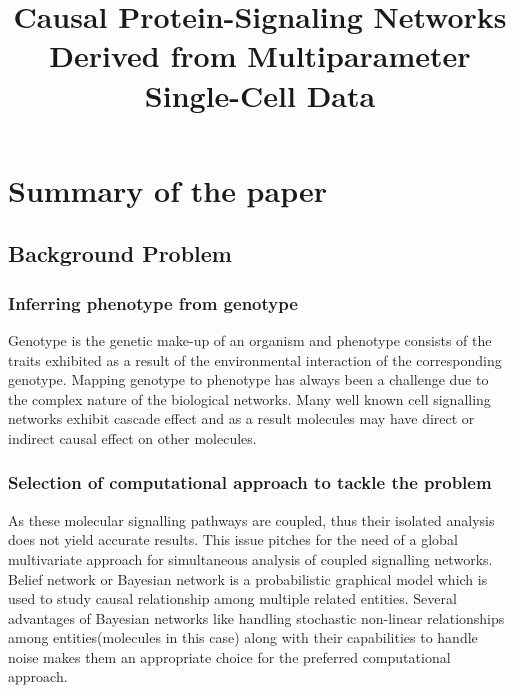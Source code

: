\documentclass[conference]{IEEEtran}
\begin{document}
\title{Causal Protein-Signaling Networks Derived from Multiparameter Single-Cell Data}

\author{
\and
{}
\and
{}
\and
{}
\and
{}
}

\maketitle

\thispagestyle{firstpage}

\IEEEpeerreviewmaketitle

\section*{Summary of the paper \cite{sachs2005causal}}
 
\subsection{Background Problem}

\subsubsection{Inferring phenotype from genotype}
Genotype is the genetic make-up of an organism and phenotype consists of the traits exhibited as a result of the environmental interaction of the corresponding genotype. Mapping genotype to phenotype has always been a challenge due to the complex nature of the biological networks. Many well known cell signalling networks exhibit cascade effect and as a result molecules may have direct or indirect causal effect on other molecules.

\subsubsection{Selection of computational approach to tackle the problem}
As these molecular signalling pathways are coupled, thus their isolated analysis does not yield accurate results. This issue pitches for the need of a global multivariate approach for simultaneous analysis of coupled signalling networks.
Belief network or Bayesian network is a probabilistic graphical model which is used to study causal relationship among multiple related entities. Several advantages of Bayesian networks like handling stochastic non-linear relationships among entities(molecules in this case) along with their capabilities to handle noise makes them an appropriate choice for the preferred computational approach.
\end{document}
